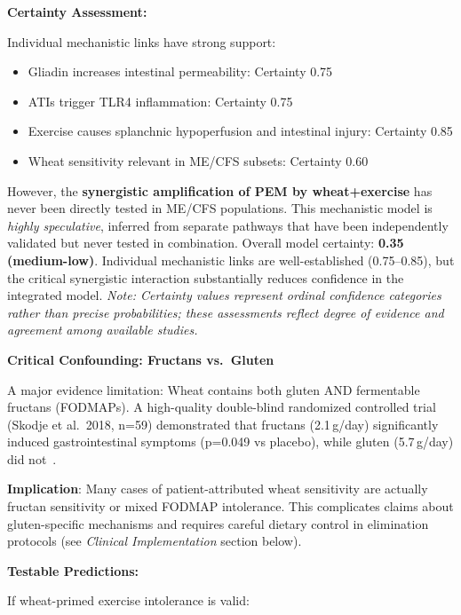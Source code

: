 \begin{speculation}
\textbf{Certainty Assessment:}

Individual mechanistic links have strong support:
\begin{itemize}
    \item Gliadin increases intestinal permeability: Certainty 0.75
    \item ATIs trigger TLR4 inflammation: Certainty 0.75
    \item Exercise causes splanchnic hypoperfusion and intestinal injury: Certainty 0.85
    \item Wheat sensitivity relevant in ME/CFS subsets: Certainty 0.60
\end{itemize}

However, the \textbf{synergistic amplification of PEM by wheat+exercise} has never been directly tested in ME/CFS populations. This mechanistic model is \emph{highly speculative}, inferred from separate pathways that have been independently validated but never tested in combination. Overall model certainty: \textbf{0.35 (medium-low)}. Individual mechanistic links are well-established (0.75--0.85), but the critical synergistic interaction substantially reduces confidence in the integrated model. \textit{Note: Certainty values represent ordinal confidence categories rather than precise probabilities; these assessments reflect degree of evidence and agreement among available studies.}

\textbf{Critical Confounding: Fructans vs.\ Gluten}

A major evidence limitation: Wheat contains both gluten AND fermentable fructans (FODMAPs). A high-quality double-blind randomized controlled trial (Skodje et al.\ 2018, n=59) demonstrated that fructans (2.1\,g/day) significantly induced gastrointestinal symptoms (p=0.049 vs placebo), while gluten (5.7\,g/day) did not~\cite{Skodje2018}.

\textbf{Implication}: Many cases of patient-attributed wheat sensitivity are actually fructan sensitivity or mixed FODMAP intolerance. This complicates claims about gluten-specific mechanisms and requires careful dietary control in elimination protocols (see \emph{Clinical Implementation} section below).

\textbf{Testable Predictions:}

If wheat-primed exercise intolerance is valid:


\end{speculation}
